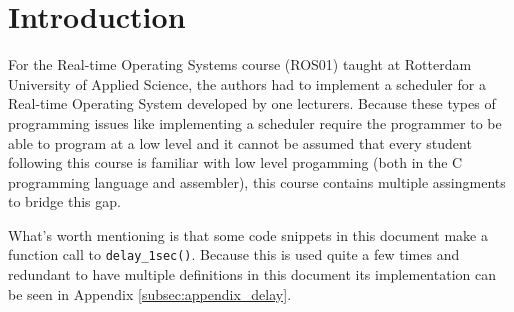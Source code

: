 \section{Introduction}

For the Real-time Operating Systems course (ROS01) taught at Rotterdam University of Applied Science,
the authors had to implement a scheduler for a Real-time Operating System developed by one lecturers.
Because these types of programming issues like implementing a scheduler require the programmer to be able to program at a low level and it cannot be assumed that every student following this course is familiar with low level progamming (both in the C programming language and assembler), this course contains multiple assingments to bridge this gap.

What's worth mentioning is that some code snippets in this document make a function call to \texttt{delay\_1sec()}.
Because this is used quite a few times and redundant to have multiple definitions in this document its implementation can be seen in Appendix \ref{subsec:appendix_delay}.

